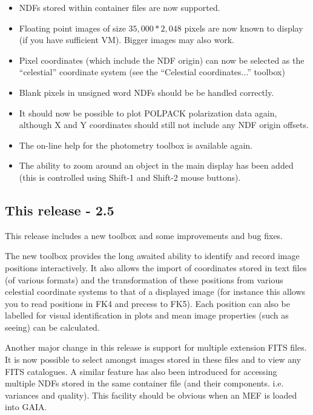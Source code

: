 \documentclass[twoside,11pt]{article}
\renewcommand{\_}{\texttt{\symbol{95}}}
\begin{document}
\begin{itemize}
\item NDFs stored within container files are now supported.

\item Floating point images of size $35,000*2,048$ pixels are now known to
      display (if you have sufficient VM). Bigger images may also work.

\item Pixel coordinates (which include the NDF origin) can now be
      selected as the ``celestial'' coordinate system (see the
      ``Celestial coordinates...'' toolbox)

\item Blank pixels in unsigned word NDFs should be be handled
      correctly.

\item It should now be possible to plot POLPACK polarization data
      again, although X and Y coordinates should still not include any
      NDF origin offsets.

\item The on-line help for the photometry toolbox is available
      again.

\item The ability to zoom around an object in the main display has
      been added (this is controlled using Shift-1 and Shift-2 mouse
      buttons).

\end{itemize}

\subsection{This release - 2.5}
  This release includes a new toolbox and some improvements and bug
  fixes.

  The new toolbox provides the long awaited ability to identify and
  record image positions interactively. It also allows the import of
  coordinates stored in text files (of various formats) and the
  transformation of these positions from various celestial coordinate
  systems to that of a displayed image (for instance this allows you
  to read positions in FK4 and precess to FK5). Each position can also
  be labelled for visual identification in plots and mean image
  properties (such as seeing) can be calculated.

  Another major change in this release is support for multiple
  extension FITS files. It is now possible to select amongst images
  stored in these files and to view any FITS catalogues. A similar
  feature has also been introduced for accessing multiple NDFs stored
  in the same container file (and their components. i.e. variances and
  quality). This facility should be obvious when an MEF is loaded into
  GAIA.
\end{document}
